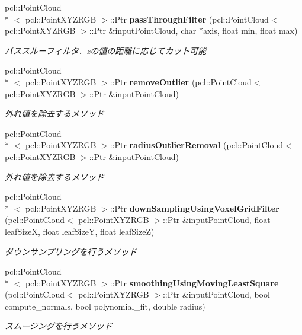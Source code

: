 \begin{DoxyCompactItemize}
pcl\-::\-Point\-Cloud\\*
$<$ pcl\-::\-Point\-X\-Y\-Z\-R\-G\-B $>$\-::Ptr {\bf pass\-Through\-Filter} (pcl\-::\-Point\-Cloud$<$ pcl\-::\-Point\-X\-Y\-Z\-R\-G\-B $>$\-::Ptr \&input\-Point\-Cloud, char $\ast$axis, float min, float max)
\begin{DoxyCompactList}\small\item\em パススルーフィルタ．zの値の距離に応じてカット可能 \end{DoxyCompactList}\item 
pcl\-::\-Point\-Cloud\\*
$<$ pcl\-::\-Point\-X\-Y\-Z\-R\-G\-B $>$\-::Ptr {\bf remove\-Outlier} (pcl\-::\-Point\-Cloud$<$ pcl\-::\-Point\-X\-Y\-Z\-R\-G\-B $>$\-::Ptr \&input\-Point\-Cloud)
\begin{DoxyCompactList}\small\item\em 外れ値を除去するメソッド \end{DoxyCompactList}\item 
pcl\-::\-Point\-Cloud\\*
$<$ pcl\-::\-Point\-X\-Y\-Z\-R\-G\-B $>$\-::Ptr {\bf radius\-Outlier\-Removal} (pcl\-::\-Point\-Cloud$<$ pcl\-::\-Point\-X\-Y\-Z\-R\-G\-B $>$\-::Ptr \&input\-Point\-Cloud)
\begin{DoxyCompactList}\small\item\em 外れ値を除去するメソッド \end{DoxyCompactList}\item 
pcl\-::\-Point\-Cloud\\*
$<$ pcl\-::\-Point\-X\-Y\-Z\-R\-G\-B $>$\-::Ptr {\bf down\-Sampling\-Using\-Voxel\-Grid\-Filter} (pcl\-::\-Point\-Cloud$<$ pcl\-::\-Point\-X\-Y\-Z\-R\-G\-B $>$\-::Ptr \&input\-Point\-Cloud, float leaf\-Size\-X, float leaf\-Size\-Y, float leaf\-Size\-Z)
\begin{DoxyCompactList}\small\item\em ダウンサンプリングを行うメソッド \end{DoxyCompactList}\item 
pcl\-::\-Point\-Cloud\\*
$<$ pcl\-::\-Point\-X\-Y\-Z\-R\-G\-B $>$\-::Ptr {\bf smoothing\-Using\-Moving\-Least\-Square} (pcl\-::\-Point\-Cloud$<$ pcl\-::\-Point\-X\-Y\-Z\-R\-G\-B $>$\-::Ptr \&input\-Point\-Cloud, bool compute\-\_\-normals, bool polynomial\-\_\-fit, double radius)
\begin{DoxyCompactList}\small\item\em スムージングを行うメソッド \end{DoxyCompactList}\item 

\end{DoxyCompactItemize}
